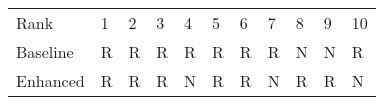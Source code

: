 \begin{tabular}{lllllllllll}
Rank & 1 & 2 & 3 & 4 & 5 & 6 & 7 & 8 & 9 & 10 \\
Baseline & R & R & R & R & R & R & R & N & N & R \\
Enhanced & R & R & R & N & R & R & N & R & R & N \\
\end{tabular}
